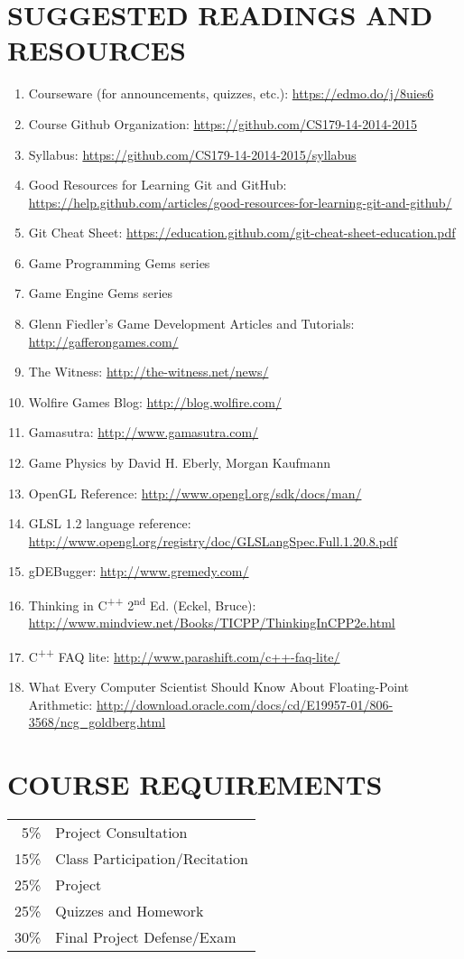 \documentclass[10pt]{article}
\begin{document}
\section{SUGGESTED READINGS AND RESOURCES}
\begin{enumerate}[noitemsep]
\item Courseware (for announcements, quizzes, etc.): \url{https://edmo.do/j/8uies6}
\item Course Github Organization: \url{https://github.com/CS179-14-2014-2015}
\item Syllabus: \url{https://github.com/CS179-14-2014-2015/syllabus}
\item Good Resources for Learning Git and GitHub: \url{https://help.github.com/articles/good-resources-for-learning-git-and-github/}
\item Git Cheat Sheet: \url{https://education.github.com/git-cheat-sheet-education.pdf}
\item Game Programming Gems series
\item Game Engine Gems series
\item Glenn Fiedler's Game Development Articles and Tutorials: \url{http://gafferongames.com/}
\item The Witness: \url{http://the-witness.net/news/}
\item Wolfire Games Blog: \url{http://blog.wolfire.com/}
\item Gamasutra: \url{http://www.gamasutra.com/}
\item Game Physics by David H. Eberly, Morgan Kaufmann
\item OpenGL Reference: \url{http://www.opengl.org/sdk/docs/man/}
\item GLSL 1.2 language reference: \url{http://www.opengl.org/registry/doc/GLSLangSpec.Full.1.20.8.pdf}
\item gDEBugger: \url{http://www.gremedy.com/}
\item Thinking in C\textsuperscript{++} 2\textsuperscript{nd} Ed. (Eckel, Bruce): \\\url{http://www.mindview.net/Books/TICPP/ThinkingInCPP2e.html}
\item C\textsuperscript{++} FAQ lite: \url{http://www.parashift.com/c++-faq-lite/}
\item What Every Computer Scientist Should Know About Floating-Point Arithmetic: \url{http://download.oracle.com/docs/cd/E19957-01/806-3568/ncg_goldberg.html}
\end{enumerate}

\section{COURSE REQUIREMENTS}
\begin{center}
\begin{tabular}{rl}
5\% & Project Consultation\\
15\% & Class Participation/Recitation\\
25\% & Project\\
25\% & Quizzes and Homework\\
30\% & Final Project Defense/Exam\\
\end{tabular}
\end{center}
\end{document}
